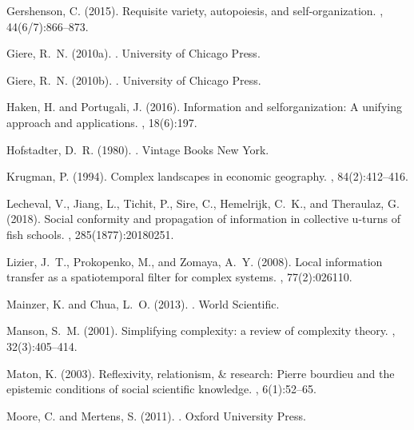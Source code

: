 \begin{thebibliography}{}
Gershenson, C. (2015).
\newblock Requisite variety, autopoiesis, and self-organization.
, 44(6/7):866--873.

Giere, R.~N. (2010a).
.
\newblock University of Chicago Press.

Giere, R.~N. (2010b).
.
\newblock University of Chicago Press.

Haken, H. and Portugali, J. (2016).
\newblock Information and selforganization: A unifying approach and
  applications.
, 18(6):197.

Hofstadter, D.~R. (1980).
.
\newblock Vintage Books New York.

Krugman, P. (1994).
\newblock Complex landscapes in economic geography.
, 84(2):412--416.

Lecheval, V., Jiang, L., Tichit, P., Sire, C., Hemelrijk, C.~K., and Theraulaz,
  G. (2018).
\newblock Social conformity and propagation of information in collective
  u-turns of fish schools.
, 285(1877):20180251.

Lizier, J.~T., Prokopenko, M., and Zomaya, A.~Y. (2008).
\newblock Local information transfer as a spatiotemporal filter for complex
  systems.
, 77(2):026110.

Mainzer, K. and Chua, L.~O. (2013).
.
\newblock World Scientific.

Manson, S.~M. (2001).
\newblock Simplifying complexity: a review of complexity theory.
, 32(3):405--414.

Maton, K. (2003).
\newblock Reflexivity, relationism, \& research: Pierre bourdieu and the
  epistemic conditions of social scientific knowledge.
, 6(1):52--65.

Moore, C. and Mertens, S. (2011).
.
\newblock Oxford University Press.


\end{thebibliography}
